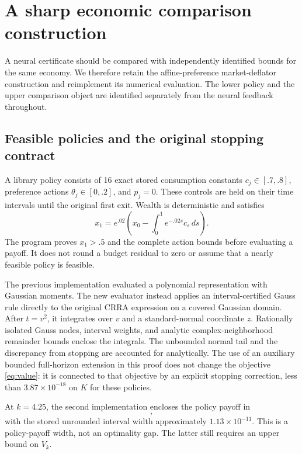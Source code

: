 \section{A sharp economic comparison construction}\label{sec:dual}
A neural certificate should be compared with independently identified bounds for the same economy. We therefore retain the affine-preference market-deflator construction and reimplement its numerical evaluation. The lower policy and the upper comparison object are identified separately from the neural feedback throughout.

\subsection{Feasible policies and the original stopping contract}
A library policy consists of 16 exact stored consumption constants $c_j\in[.7,.8]$, preference actions $\theta_j\in[0,.2]$, and $p_j=0$. These controls are held on their time intervals until the original first exit. Wealth is deterministic and satisfies
\[
 x_1=e^{.02}\left(x_0-\int_0^1e^{-.02s}c_s\,ds\right).
\]
The program proves $x_1>.5$ and the complete action bounds before evaluating a payoff. It does not round a budget residual to zero or assume that a nearly feasible policy is feasible.

The previous implementation evaluated a polynomial representation with Gaussian moments. The new evaluator instead applies an interval-certified Gauss rule directly to the original CRRA expression on a covered Gaussian domain. After $t=v^2$, it integrates over $v$ and a standard-normal coordinate $z$. Rationally isolated Gauss nodes, interval weights, and analytic complex-neighborhood remainder bounds enclose the integrals. The unbounded normal tail and the discrepancy from stopping are accounted for analytically. The use of an auxiliary bounded full-horizon extension in this proof does not change the objective \eqref{eq:value}: it is connected to that objective by an explicit stopping correction, less than $3.87\times10^{-18}$ on $K$ for these policies.

At $k=4.25$, the second implementation encloses the policy payoff in
\begin{equation}
 [-1.315469674845588,\ -1.315469674834266],\label{eq:primalexample}
\end{equation}
with the stored unrounded interval width approximately $1.13\times10^{-11}$. This is a policy-payoff width, not an optimality gap. The latter still requires an upper bound on $V_k$.

